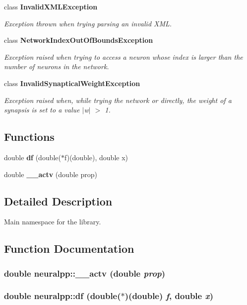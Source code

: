 \begin{CompactItemize}
class {\bf InvalidXMLException}
\begin{CompactList}\small\item\em Exception thrown when trying parsing an invalid XML. \item\end{CompactList}\item 
class {\bf NetworkIndexOutOfBoundsException}
\begin{CompactList}\small\item\em Exception raised when trying to access a neuron whose index is larger than the number of neurons in the network. \item\end{CompactList}\item 
class {\bf InvalidSynapticalWeightException}
\begin{CompactList}\small\item\em Exception raised when, while trying the network or directly, the weight of a synapsis is set to a value $|$w$|$ $>$ 1. \item\end{CompactList}\end{CompactItemize}
\subsection*{Functions}
\begin{CompactItemize}
\item 
double {\bf df} (double($\ast$f)(double), double x)
\item 
double {\bf \_\-\_\-actv} (double prop)
\end{CompactItemize}


\subsection{Detailed Description}
Main namespace for the library. 

\subsection{Function Documentation}
\subsubsection[\_\-\_\-actv]{\setlength{\rightskip}{0pt plus 5cm}double neuralpp::\_\-\_\-actv (double {\em prop})}\label{namespaceneuralpp_7df3a0de999c7a635f2289749ed4f194}


\subsubsection[df]{\setlength{\rightskip}{0pt plus 5cm}double neuralpp::df (double($\ast$)(double) {\em f}, \/  double {\em x})}\label{namespaceneuralpp_43c8197cc83f65fa9676386579671aec}


